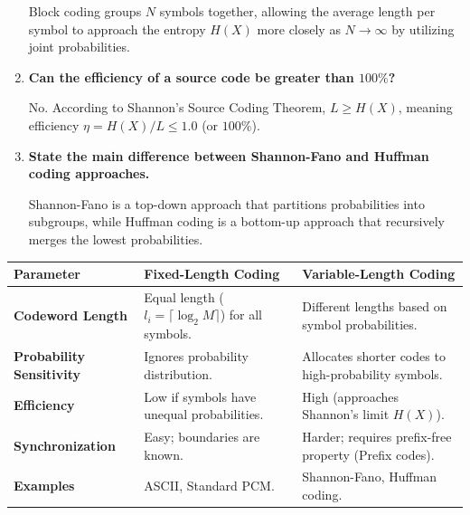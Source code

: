 \documentclass[12pt,a4paper]{article}
\newcommand{\Q}[1]{\textbf{#1}\par\noindent\ignorespaces}
\renewcommand{\arraystretch}{1.45}
\begin{document}
\begin{tcolorbox}[exambox, title={\textbf{Frequently Asked / Viva Questions}}]
\begin{enumerate}[topsep=0pt, label=\textbf{Q\arabic*.}, itemsep=5pt]
    Block coding groups $N$ symbols together, allowing the average length per symbol to approach the entropy $H(X)$ more closely as $N \to \infty$ by utilizing joint probabilities.
  \item \Q{Can the efficiency of a source code be greater than $100\%$?}
    No. According to Shannon's Source Coding Theorem, $L \ge H(X)$, meaning efficiency $\eta = H(X)/L \le 1.0$ (or $100\%$).
  \item \Q{State the main difference between Shannon-Fano and Huffman coding approaches.}
    Shannon-Fano is a top-down approach that partitions probabilities into subgroups, while Huffman coding is a bottom-up approach that recursively merges the lowest probabilities.
\end{enumerate}
\end{tcolorbox}

\begin{tcolorbox}[tikzbox, title={Comparison of Source Coding Techniques}]
\renewcommand{\arraystretch}{1.4}
\par\noindent
\begin{tabularx}{\linewidth}{|B{3.2cm}|Y|Y|}
\hline
\textbf{Parameter} & \textbf{\color{myteal}Fixed-Length Coding} & \textbf{\color{mygreen}Variable-Length Coding} \\
\hline
\textbf{Codeword Length} & Equal length ($l_i = \lceil \log_2 M \rceil$) for all symbols. & Different lengths based on symbol probabilities. \\
\hline
\textbf{Probability Sensitivity} & Ignores probability distribution. & Allocates shorter codes to high-probability symbols. \\
\hline
\textbf{Efficiency} & Low if symbols have unequal probabilities. & High (approaches Shannon's limit $H(X)$). \\
\hline
\textbf{Synchronization} & Easy; boundaries are known. & Harder; requires prefix-free property (Prefix codes). \\
\hline
\textbf{Examples} & ASCII, Standard PCM. & Shannon-Fano, Huffman coding. \\
\hline
\end{tabularx}
\end{tcolorbox}
\end{document}
